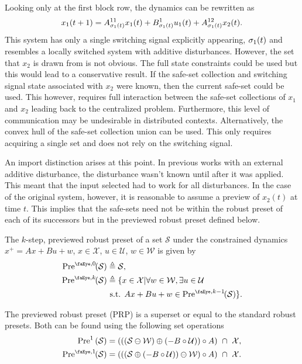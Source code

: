 \cite{Schaich2014}

Looking only at the first block row, the dynamics can be rewritten as 
\begin{equation}
x_1(t+1)=A^{11}_{\ss_1(t)}x_1(t)+B^1_{\ss_1(t)}u_1(t)+A^{12}_{\ss_1(t)}x_2(t).
\end{equation}
This system has only a single switching signal explicitly appearing, $\ss_1(t)$ and resembles a locally switched system with additive disturbances. However, the set that $x_2$ is drawn from is not obvious. The full state constraints could be used but this would lead to a conservative result. If the safe-set collection and switching signal state associated with $x_2$ were known, then the current safe-set could be used. This however, requires full interaction between the safe-set collections of $x_1$ and $x_2$ leading back to the centralized problem. Furthermore, this level of communication may be undesirable in distributed contexts. Alternatively, the convex hull of the safe-set collection union can be used. This only requires acquiring a single set and does not rely on the switching signal. 

An import distinction arises at this point. In previous works with an external additive disturbance, the disturbance wasn't known until after it was applied. This meant that the input selected had to work for all disturbances. In the case of the original system, however, it is reasonable to assume a preview of $x_2(t)$ at time $t$. This implies that the safe-sets need not be within the robust preset of each of its successors but in the previewed robust preset defined below.
\begin{definition}
The $k$-step, previewed robust preset of a set $\mathcal{S}$ under the constrained dynamics $x^+=Ax+Bu+w$, $x\in\mathcal{X}$, $u\in\mathcal{U}$, $w\in\mathcal{W}$ is given by
\begin{align}
\PreviewedPre[][0]{\mathcal{S}}&\triangleq\mathcal{S},\\
\PreviewedPre[][k]{\mathcal{S}}&\triangleq\{x\in\mathcal{X}|\forall w\in\mathcal{W},\exists u\in\mathcal{U}\nonumber\\
&\text{ s.t. }Ax+Bu+w\in\PreviewedPre[][k-1]{\mathcal{S}}\}.
\end{align}
\end{definition}
The previewed robust preset (PRP) is a superset or equal to the standard robust presets. Both can be found using the following set operations
\begin{align}
\Pre[][1]{\mathcal{S}} &= \left(\left(\left(\mathcal{S}\ominus\mathcal{W}\right)\oplus\left(-B\circ\mathcal{U}\right)\right)\circ A\right)\ \cap\ \mathcal{X},\\
\PreviewedPre[][1]{\mathcal{S}} &= \left(\left(\left(\mathcal{S}\oplus\left(-B\circ\mathcal{U}\right)\right)\ominus\mathcal{W}\right)\circ A\right)\ \cap\ \mathcal{X}.
\end{align}

